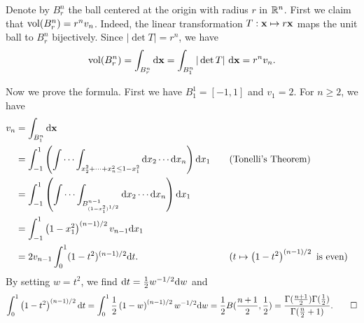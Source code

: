 
\begin{exercise}{6.10}
  Denote by $B^n_r$ the ball centered at the origin
  with radius $r$ in $\mathbb{R}^{n}$.
  First we claim that $\operatorname{vol}(B^n_r) = r^n v_n$.
  Indeed, the linear transformation $T : \mathbf{x} \mapsto r\mathbf{x}$
  maps the unit ball to $B^n_r$ bijectively.
  Since $|\det{T}| = r^n$, we have
  \[
    \operatorname{vol}(B^n_r) = \int_{B^n_r} \mathrm{d} \mathbf{x}
    = \int_{B^n_1} |\det{T}| \ \mathrm{d} \mathbf{x}
    = r^n v_n.
  \]

  Now we prove the formula.
  First we have $B^1_1 = [-1, 1]$ and $v_1 = 2$.
  For $n \ge 2$, we have
  \[
    \begin{aligned}
      v_n &= \int_{B^n_1} \mathrm{d} \mathbf{x} \\
      &= \int_{-1}^1 \left(\idotsint_{x_2^2 + \cdots + x_n^2 \le 1 - x_1^2}
      \mathrm{d} x_2 \cdots \mathrm{d} x_n\right) \mathrm{d} x_1 \quad
      &&(\text{Tonelli's Theorem}) \\
      &= \int_{-1}^1
      \left( \idotsint_{B^{n-1}_{(1-x_1^2)^{1/2}}} \mathrm{d} x_2 \cdots \mathrm{d} x_n \right)
      \mathrm{d} x_1 \\
      &= \int_{-1}^1 \left( 1 - x_1^2 \right)^{(n-1)/2} v_{n-1} \mathrm{d} x_1 \\
      &= 2 v_{n-1} \int_0^1 (1-t^2)^{(n-1)/2} \mathrm{d} t.
      \quad &&(t \mapsto \left( 1-t^2 \right)^{(n-1)/2} \text{ is even})
    \end{aligned}
  \]
  By setting $w = t^2$, we find $\mathrm{d} t = \frac{1}{2} w^{-1/2} \mathrm{d} w$ and
  \[
    \int_0^1 \left( 1-t^2 \right)^{(n-1)/2} \mathrm{d} t
    = \int_0^1 \frac{1}{2} \left( 1-w \right)^{(n-1)/2} w^{-1/2} \mathrm{d} w
    = \frac{1}{2} B(\frac{n+1}{2}, \frac{1}{2})
    = \frac {\Gamma(\frac{n+1}{2}) \Gamma(\frac{1}{2})} {\Gamma(\frac{n}{2}+1)}.
    \qedhere
  \]
\end{exercise}
